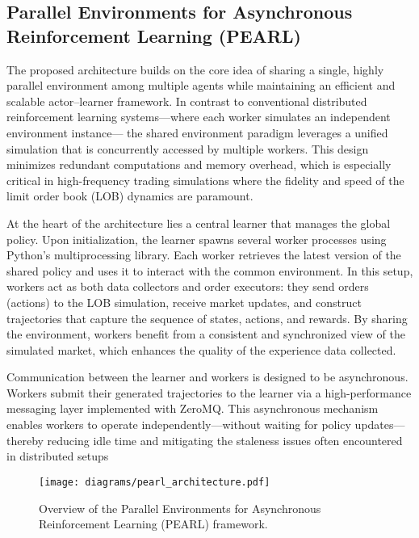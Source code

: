 \documentclass[11pt]{article}
\begin{document}
    \subsection{Parallel Environments for Asynchronous Reinforcement Learning (PEARL)}
    \label{subsec:pearl}
    The proposed architecture builds on the core idea of sharing a single, highly parallel environment among multiple agents while
    maintaining an efficient and scalable actor–learner framework.
    In contrast to conventional distributed reinforcement learning systems—where each worker simulates an independent environment instance—
    the shared environment paradigm leverages a unified simulation that is concurrently accessed by multiple workers.
    This design minimizes redundant computations and memory overhead,
    which is especially critical in high-frequency trading simulations where the fidelity and speed of the limit order book (LOB) dynamics are paramount.

    At the heart of the architecture lies a central learner that manages the global policy.
    Upon initialization, the learner spawns several worker processes using Python's multiprocessing library.
    Each worker retrieves the latest version of the shared policy and uses it to interact with the common environment.
    In this setup, workers act as both data collectors and order executors: they send orders (actions) to the LOB simulation,
    receive market updates, and construct trajectories that capture the sequence of states, actions, and rewards.
    By sharing the environment, workers benefit from a consistent and synchronized view of the simulated market,
    which enhances the quality of the experience data collected.

    Communication between the learner and workers is designed to be asynchronous.
    Workers submit their generated trajectories to the learner via a high-performance messaging layer implemented with ZeroMQ\@.
    This asynchronous mechanism enables workers to operate independently—without waiting for policy updates—
    thereby reducing idle time and mitigating the staleness issues often encountered in distributed setups

    \begin{figure}[htb]
        \centering
        \texttt{[image: diagrams/pearl\_architecture.pdf]}
        \caption{Overview of the Parallel Environments for Asynchronous Reinforcement Learning (PEARL) framework.}
        \label{fig:pearl_architecture}
    \end{figure}
\end{document}
